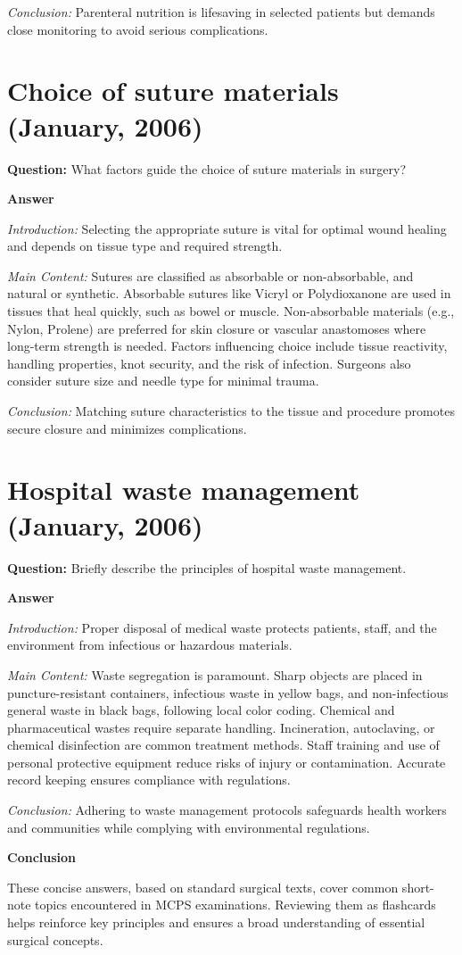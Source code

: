 \documentclass{article}
\begin{document}
\emph{Conclusion:} Parenteral nutrition is lifesaving in selected patients but demands close monitoring to avoid serious complications.


\section{Choice of suture materials (January, 2006)}


\textbf{Question:} What factors guide the choice of suture materials in surgery?

\textbf{Answer}

\emph{Introduction:} Selecting the appropriate suture is vital for optimal wound healing and depends on tissue type and required strength.

\emph{Main Content:} Sutures are classified as absorbable or non-absorbable, and natural or synthetic. Absorbable sutures like Vicryl or Polydioxanone are used in tissues that heal quickly, such as bowel or muscle. Non-absorbable materials (e.g., Nylon, Prolene) are preferred for skin closure or vascular anastomoses where long-term strength is needed. Factors influencing choice include tissue reactivity, handling properties, knot security, and the risk of infection. Surgeons also consider suture size and needle type for minimal trauma.

\emph{Conclusion:} Matching suture characteristics to the tissue and procedure promotes secure closure and minimizes complications.


\section{Hospital waste management (January, 2006)}


\textbf{Question:} Briefly describe the principles of hospital waste management.

\textbf{Answer}

\emph{Introduction:} Proper disposal of medical waste protects patients, staff, and the environment from infectious or hazardous materials.

\emph{Main Content:} Waste segregation is paramount. Sharp objects are placed in puncture-resistant containers, infectious waste in yellow bags, and non-infectious general waste in black bags, following local color coding. Chemical and pharmaceutical wastes require separate handling. Incineration, autoclaving, or chemical disinfection are common treatment methods. Staff training and use of personal protective equipment reduce risks of injury or contamination. Accurate record keeping ensures compliance with regulations.

\emph{Conclusion:} Adhering to waste management protocols safeguards health workers and communities while complying with environmental regulations.


\textbf{Conclusion}

These concise answers, based on standard surgical texts, cover common short-note topics encountered in MCPS examinations. Reviewing them as flashcards helps reinforce key principles and ensures a broad understanding of essential surgical concepts.
\end{document}

